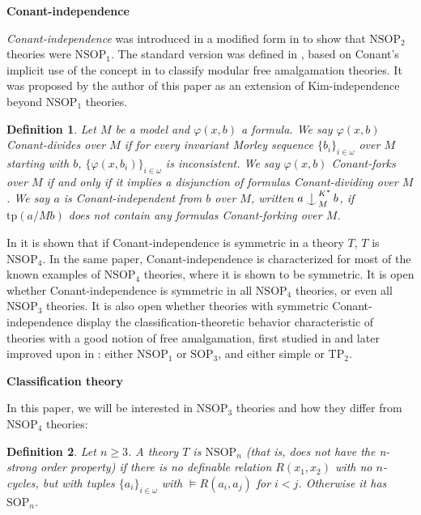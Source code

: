 \documentclass[12pt]{amsart}
\newtheorem{definition}{Definition}[section]
\theoremstyle{definition}
\def\Ind#1#2{#1\setbox0=\hbox{$#1x$}\kern\wd0\hbox to 0pt{\hss$#1\mid$\hss}
\lower.9\ht0\hbox to 0pt{\hss$#1\smile$\hss}\kern\wd0}
\def\ind{\mathop{\mathpalette\Ind{}}}
\begin{document}
\textbf{Conant-independence}

\textit{Conant-independence} was introduced in a modified form in \cite{NSOP2} to show that $\mathrm{NSOP}_{2}$ theories were $\mathrm{NSOP}_{1}$. The standard version was defined in \cite{GFA}, based on Conant's implicit use of the concept in \cite{Co15} to classify modular free amalgamation theories. It was proposed by the author of this paper as an extension of Kim-independence beyond $\mathrm{NSOP}_{1}$ theories.

\begin{definition}\label{4-conantindependence}
Let $M$ be a model and $\varphi(x, b)$ a formula. We say $\varphi(x, b)$ \emph{Conant-divides} over $M$ if for \emph{every} invariant Morley sequence $\{b_{i}\}_{i \in \omega}$ over $M$ starting with $b$, $\{\varphi(x, b_i)\}_{i \in \omega}$ is inconsistent. We say $\varphi(x, b)$ \emph{Conant-forks} over $M$ if and only if it implies a disjunction of formulas Conant-dividing over $M$. We say $a$ is \emph{Conant-independent} from $b$ over $M$, written $a \ind^{K^{*}}_{M}b$, if $\mathrm{tp}(a/Mb)$ does not contain any formulas Conant-forking over $M$.
\end{definition}

In \cite{GFA} it is shown that if Conant-independence is symmetric in a theory $T$, $T$ is $\mathrm{NSOP}_{4}$. In the same paper, Conant-independence is characterized for most of the known examples of $\mathrm{NSOP}_{4}$ theories, where it is shown to be symmetric. It is open whether Conant-independence is symmetric in all $\mathrm{NSOP}_{4}$ theories, or even all $\mathrm{NSOP}_{3}$ theories. It is also open whether theories with symmetric Conant-independence display the classification-theoretic behavior characteristic of theories with a good notion of free amalgamation, first studied in \cite{Co15} and later improved upon in \cite{GFA}: either $\mathrm{NSOP}_{1}$ or $\mathrm{SOP}_{3}$, and either simple or $\mathrm{TP}_{2}$.


\textbf{Classification theory}

In this paper, we will be interested in $\mathrm{NSOP}_{3}$ theories and how they differ from $\mathrm{NSOP}_{4}$ theories:

\begin{definition}
Let $n \geq 3$. A theory $T$ is $\mathrm{NSOP}_{n}$ (that is, does not have the \emph{n-strong order property}) if there is no definable relation $R(x_{1}, x_{2})$ with no $n$-cycles, but with tuples $\{a_{i}\}_{i \in \omega}$ with $\models R(a_{i}, a_{j})$ for $i <j$. Otherwise it has $\mathrm{SOP}_{n}$.
\end{definition}
\end{document}
